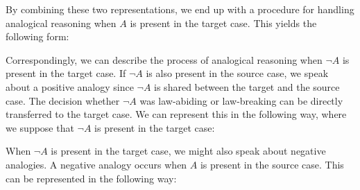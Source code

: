 		By combining these two representations, we end up with a procedure for handling analogical reasoning when $A$ is present in the target case. This yields the following form:\medskip
			
			\noindent\begin{minipage}{0.9\textwidth}
			\end{minipage}\medskip	
		
		Correspondingly, we can describe the process of analogical reasoning when $\neg A$ is present in the target case. If $\neg A$ is also present in the source case, we speak about a positive analogy since $\neg A$ is shared between the target and the source case. The decision whether $\neg A$ was law-abiding or law-breaking can be directly transferred to the target case. We can represent this in the following way, where we suppose that $\neg A$ is present in the target case:\medskip
			
			\noindent\begin{minipage}{0.9\textwidth}
			\end{minipage}	\medskip			
		
		When $\neg A$ is present in the target case, we might also speak about negative analogies. A negative analogy occurs when $A$ is present in the source case. This can be represented in the following way:\medskip
			
			\noindent\begin{minipage}{0.9\textwidth}
			\end{minipage}\medskip			
		
